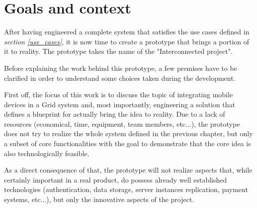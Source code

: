 \section{Goals and context}
After having engineered a complete system that satisfies the use cases defined in \textit{section \ref{use_cases}}, it is now time to create a prototype that brings a portion of it to reality. The prototype takes the name of the "Interconnected project".

Before explaining the work behind this prototype, a few premises have to be clarified in order to understand some choices taken during the development.

First off, the focus of this work is to discuss the topic of integrating mobile devices in a Grid system and, most importantly, engineering a solution that defines a blueprint for actually bring the idea to reality. Due to a lack of resources (economical, time, equipment, team members, etc...), the prototype does not try to realize the whole system defined in the previous chapter, but only a subset of core functionalities with the goal to demonstrate that the core idea is also technologically feasible.

As a direct consequence of that, the prototype will not realize aspects that, while certainly important in a real product, do possess already well established technologies (authentication, data storage, server instances replication, payment systems, etc...), but only the innovative aspects of the project.
